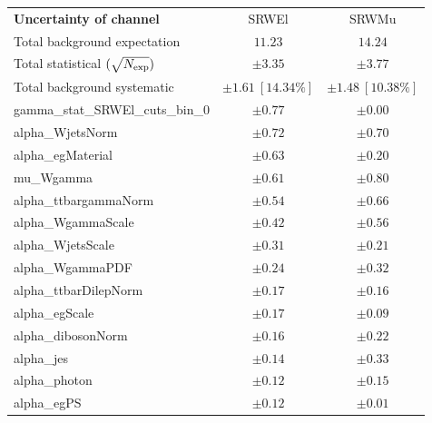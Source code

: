 
\begin{table}
\begin{center}
\setlength{\tabcolsep}{0.0pc}
\begin{tabular*}{\textwidth}{@{\extracolsep{\fill}}lcc}
\noalign{\smallskip}\hline\noalign{\smallskip}
{\bf Uncertainty of channel}                                    & SRWEl            & SRWMu            \\
\noalign{\smallskip}\hline\noalign{\smallskip}
Total background expectation             &  $11.23$        &  $14.24$       \\
\noalign{\smallskip}\hline\noalign{\smallskip}
Total statistical $(\sqrt{N_{\rm exp}})$              & $\pm 3.35$        & $\pm 3.77$       \\
Total background systematic               & $\pm 1.61\ [14.34\%] $        & $\pm 1.48\ [10.38\%] $             \\
\noalign{\smallskip}\hline\noalign{\smallskip}
\noalign{\smallskip}\hline\noalign{\smallskip}
gamma\_stat\_SRWEl\_cuts\_bin\_0         & $\pm 0.77$          & $\pm 0.00$       \\
alpha\_WjetsNorm         & $\pm 0.72$          & $\pm 0.70$       \\
alpha\_egMaterial         & $\pm 0.63$          & $\pm 0.20$       \\
mu\_Wgamma         & $\pm 0.61$          & $\pm 0.80$       \\
alpha\_ttbargammaNorm         & $\pm 0.54$          & $\pm 0.66$       \\
alpha\_WgammaScale         & $\pm 0.42$          & $\pm 0.56$       \\
alpha\_WjetsScale         & $\pm 0.31$          & $\pm 0.21$       \\
alpha\_WgammaPDF         & $\pm 0.24$          & $\pm 0.32$       \\
alpha\_ttbarDilepNorm         & $\pm 0.17$          & $\pm 0.16$       \\
alpha\_egScale         & $\pm 0.17$          & $\pm 0.09$       \\
alpha\_dibosonNorm         & $\pm 0.16$          & $\pm 0.22$       \\
alpha\_jes         & $\pm 0.14$          & $\pm 0.33$       \\
alpha\_photon         & $\pm 0.12$          & $\pm 0.15$       \\
alpha\_egPS         & $\pm 0.12$          & $\pm 0.01$       \\

\end{tabular*}
\end{center}
\end{table}
